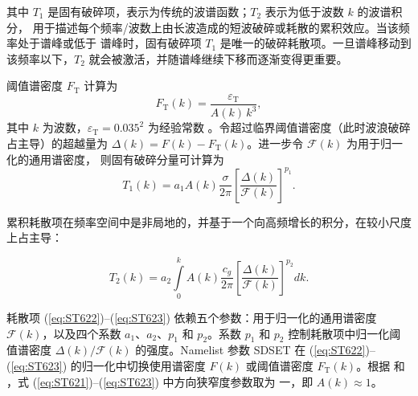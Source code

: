 \noindent
其中 $T_1$ 是固有破碎项，表示为传统的波谱函数；$T_2$ 表示为低于波数 $k$ 的波谱积分，
用于描述每个频率/波数上由长波造成的短波破碎或耗散的累积效应。当该频率处于谱峰或低于
谱峰时，固有破碎项 $T_1$ 是唯一的破碎耗散项。一旦谱峰移动到该频率以下，$T_2$
就会被激活，并随谱峰继续下移而逐渐变得更重要。

阈值谱密度 $F_{\mathrm{T}}$ 计算为
\begin{equation}\label{eq:ST621}
  F_{\mathrm{T}}(k)=\frac{\varepsilon_{\mathrm{T}}}{A(k)\,k^3}  ,
\end{equation}
其中 $k$ 为波数，$\varepsilon_{\mathrm{T}}=0.035^2$ 为经验常数
\citep{art:Bea07,bk:Bab11}。令超过临界阈值谱密度（此时波浪破碎占主导）的超越量为
$\Delta(k)=F(k)-F_{\mathrm{T}}(k)$。进一步令 $\mathcal{F}(k)$ 为用于归一化的通用谱密度，
则固有破碎分量可计算为
\begin{equation}\label{eq:ST622}
T_1(k)=a_1 A(k)\frac{\sigma}{2\pi} \left [ \frac{\Delta(k)}{\mathcal{F}(k)}
\right ]^{p_1}  .
\end{equation}

\noindent
累积耗散项在频率空间中是非局地的，并基于一个向高频增长的积分，在较小尺度上占主导：

\begin{equation}\label{eq:ST623}
T_2(k)=a_2 \int\limits_0^k A(k) \frac{c_g}{2\pi} \left [
\frac{\Delta(k)}{\mathcal{F}(k)} \right ]^{p_2}\!\!dk .
\end{equation}

\noindent
耗散项 (\ref{eq:ST622})--(\ref{eq:ST623}) 依赖五个参数：用于归一化的通用谱密度
$\mathcal{F}(k)$，以及四个系数 $a_1$、$a_2$、$p_1$ 和 $p_2$。系数 $p_1$ 和 $p_2$
控制耗散项中归一化阈值谱密度 $\Delta(k)/\mathcal{F}(k)$ 的强度。Namelist 参数
{\code SDSET} 在 (\ref{eq:ST622})--(\ref{eq:ST623}) 的归一化中切换使用谱密度
$F(k)$ 或阈值谱密度 $F_{\mathrm{T}}(k)$。根据 \citet{art:Bea07} 和
\citet{art:Bab09}，式 (\ref{eq:ST621})--(\ref{eq:ST623}) 中方向狭窄度参数取为
一，即 $A(k)\approx 1$。

